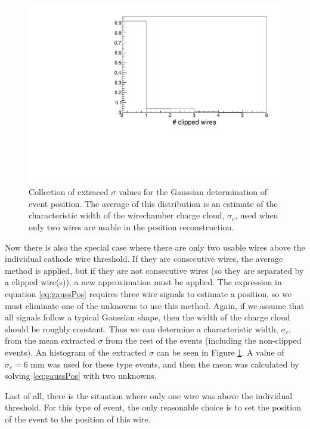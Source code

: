 \begin{figure}[h]
  \centering
  \includegraphics[scale=0.5,page=7]{4-UCNACalibrations/mwpc_position.pdf} 
  \caption{Collection of extraced $\sigma$ values for the Gaussian determination of event position. The
    average of this distribution is an estimate of the characteristic width of the wirechamber charge cloud,
    $\sigma_c$, used when only two wires are usable in the position reconstruction.}
  \label{fig:meanSigma}
\end{figure}

Now there is also the special case where there are only two usable wires above the individual cathode
wire threshold. If they are consecutive wires, the average method is applied, but if they are not consecutive wires
(so they are separated by a clipped wire(s)), a new approximation must be applied. The expression in
equation \ref{eq:gaussPos} requires three wire signals to estimate a position, so we must eliminate one of the unknowns
to use this method. Again, if we assume that all signals follow a typical Gaussian shape, then the width of the
charge cloud should be roughly constant. Thus we can determine a characteristic width, $\sigma_c$, from the
mean extracted $\sigma$ from the rest of the events (including the non-clipped events). An histogram of the
extracted $\sigma$ can be seen in Figure \ref{fig:meanSigma}. A value of $\sigma_c = 6\text{~mm}$ was used
for these type events, and then the mean was calculated by solving \ref{eq:gaussPos} with two unknowns.

Last of all, there is the situation where only one wire was above the individual threshold. For this type of event,
the only reasonable choice is to set the position of the event to the position of this wire.

